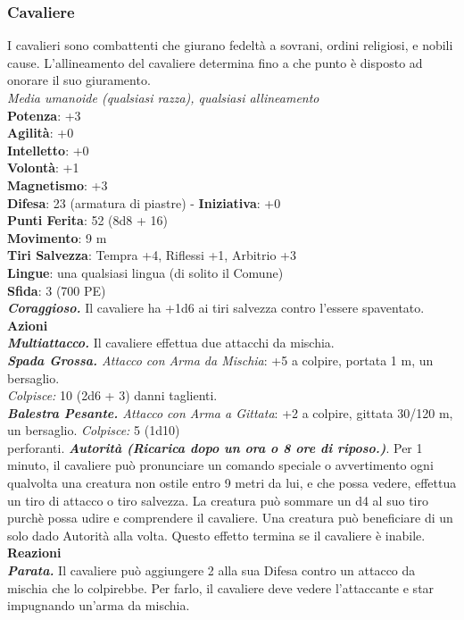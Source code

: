 \begin{multicols}{2}
\subsubsection*{Cavaliere}
I cavalieri sono combattenti che giurano fedeltà a sovrani, ordini religiosi, e nobili cause. L'allineamento del cavaliere determina fino a che punto è disposto ad onorare il suo giuramento. \\
\emph{Media umanoide (qualsiasi razza), qualsiasi allineamento}\\
\textbf{Potenza}: +3\\
\textbf{Agilità}: +0\\
\textbf{Intelletto}: +0\\
\textbf{Volontà}: +1\\
\textbf{Magnetismo}: +3\\
\textbf{Difesa}: 23 (armatura di piastre) - \textbf{Iniziativa}: +0\\
\textbf{Punti Ferita}: 52 (8d8 + 16)\\
\textbf{Movimento}: 9 m\\
\textbf{Tiri Salvezza}: Tempra +4, Riflessi +1, Arbitrio +3 \\
\textbf{Lingue}: una qualsiasi lingua (di solito il Comune)\\
\textbf{Sfida}: 3 (700 PE)\smallskip\\
\emph{\textbf{Coraggioso.}} Il cavaliere ha +1d6 ai tiri salvezza contro l'essere spaventato.\\
\smallskip\textbf{Azioni}\\
\emph{\textbf{Multiattacco.}} Il cavaliere effettua due attacchi da mischia.\\
\emph{\textbf{Spada Grossa.} Attacco con Arma da Mischia}: +5 a colpire, portata 1 m, un bersaglio.\\
\emph{Colpisce:} 10 (2d6 + 3) danni taglienti.\\
\emph{\textbf{Balestra Pesante.} Attacco con Arma a Gittata}: +2 a colpire, gittata 30/120 m, un bersaglio. \emph{Colpisce:} 5 (1d10)\\
perforanti.
\emph{\textbf{Autorità (Ricarica dopo un ora o 8 ore di riposo.)}}. Per 1 minuto, il cavaliere può pronunciare un comando speciale o avvertimento ogni qualvolta una creatura non ostile entro 9 metri da lui, e che possa vedere, effettua un tiro di attacco o tiro salvezza. La creatura può sommare un d4 al suo tiro purchè possa udire e comprendere il cavaliere. Una creatura può beneficiare di un solo dado Autorità alla volta. Questo effetto termina se il cavaliere è inabile. \\
\textbf{Reazioni}\\
\emph{\textbf{Parata.}} Il cavaliere può aggiungere 2 alla sua Difesa contro un attacco da mischia che lo colpirebbe. Per farlo, il cavaliere deve vedere l'attaccante e star impugnando un'arma da mischia.\\


\end{multicols}

